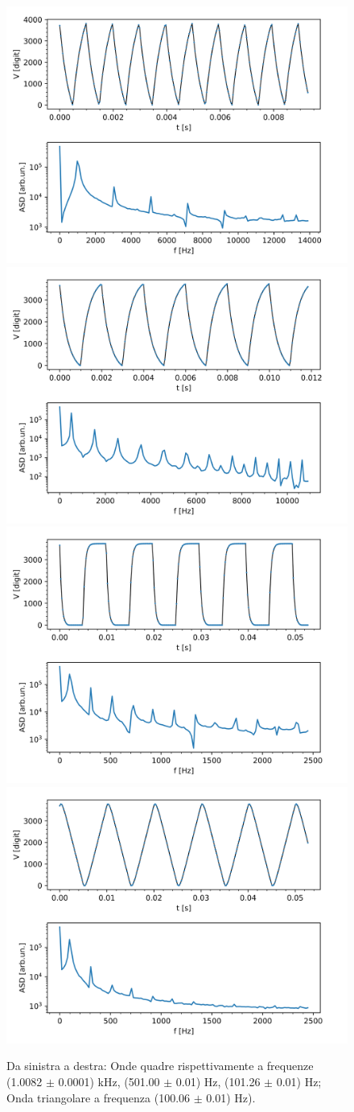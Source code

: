 \documentclass{article}[a4paper, oneside,11pt]
\begin{document}
\begin{figure}[H]
    \centering
    \includegraphics[width=0.48\columnwidth]{img/ese6/esp6-1.0082kHz.png}
    \includegraphics[width=0.48\columnwidth]{img/ese6/esp6-501.00Hz.png}
    \includegraphics[width=0.48\columnwidth]{img/ese6/esp6-101.26Hz.png}
    \includegraphics[width=0.48\columnwidth]{img/ese6/esp6-100.06Hz-T.png}
    \caption{Da sinistra a destra: Onde quadre rispettivamente a frequenze (1.0082 $\pm$ 0.0001) kHz, (501.00 $\pm$ 0.01) Hz, (101.26 $\pm$ 0.01) Hz; Onda triangolare a frequenza (100.06 $\pm$ 0.01) Hz).}
    \label{fig:ese6-grafici}
\end{figure}
\end{document}
